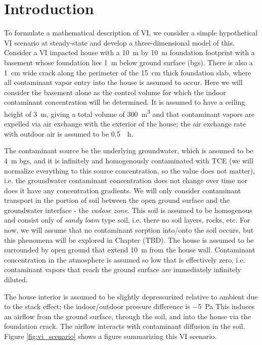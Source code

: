 \section{Introduction}

To formulate a mathematical description of VI, we consider a simple hypothetical VI scenario at steady-state and develop a three-dimensional model of this.
Consider a VI impacted house with a \SI{10}{\metre} by \SI{10}{\metre} foundation footprint with a basement whose foundation lies \SI{1}{\metre} below ground surface (bgs).
There is also a \SI{1}{\centi\metre} wide crack along the perimeter of the \SI{15}{\centi\metre} thick foundation slab, where all contaminant vapor entry into the house is assumed to occur.
Here we will consider the basement alone as the control volume for which the indoor contaminant concentration will be determined.
It is assumed to have a ceiling height of \SI{3}{\metre}, giving a total volume of \SI{300}{\metre\cubed}
and that contaminant vapors are expelled via air exchange with the exterior of the house; the air exchange rate with outdoor air is assumed to be \SI{0.5}{\per\hour}.\par

The contaminant source be the underlying groundwater, which is assumed to be \SI{4}{\metre} bgs, and it is infinitely and homogenously contaminated with TCE (we will normalize everything to this source concentration, so the value does not matter), i.e. the groundwater contaminant concentration does not change over time nor does it have any concentration gradients.
We will only consider contaminant transport in the portion of soil between the open ground surface and the groundwater interface - the \textit{vadose zone}.
This soil is assumed to be homogenous and consist only of \textit{sandy loam} type soil, i.e. there no soil layers, rocks, etc.
For now, we will assume that no contaminant sorption into/onto the soil occurs, but this phenomena will be explored in Chapter (TBD).%
The house is assumed to be surrounded by open ground that extend \SI{10}{\metre} from the house wall.
Contaminant concentration in the atmosphere is assumed so low that is effectively zero, i.e. contaminant vapors that reach the ground surface are immediately infinitely diluted. \par

The house interior is assumed to be slightly depressurized relative to ambient due to the stack effect; the indoor/outdoor pressure difference is \SI{-5}{\pascal}
This induces an airflow from the ground surface, through the soil, and into the house via the foundation crack.
The airflow interacts with contaminant diffusion in the soil.
Figure \ref{fig:vi_scenario} shows a figure summarizing this VI scenario.\par

